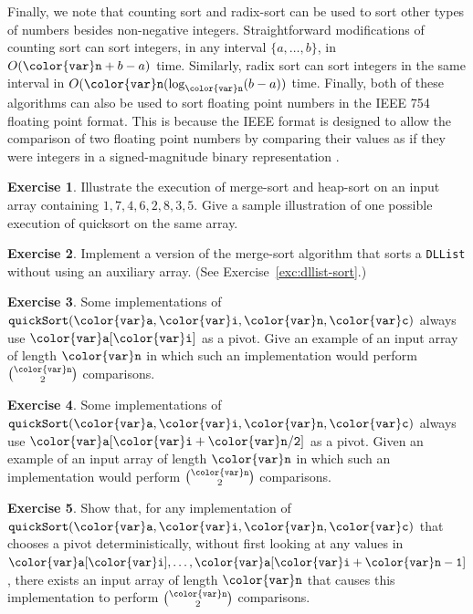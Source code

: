 \documentclass[10pt]{book}
\theoremstyle{plain}
\theoremstyle{definition}
\newtheorem{exc}{Exercise}[chapter]
\newcommand{\exclabel}[1]{\label{exc:#1}}
\newcommand{\excref}[1]{Exercise~\ref{exc:#1}}
\begin{document}
Finally, we note that counting sort and radix-sort can be used to sort
other types of numbers besides non-negative integers.  Straightforward
modifications of counting sort can sort integers, in any interval
$\{a,\ldots,b\}$, in $O(\ensuremath{\mathtt{{\color{var}n}}}+b-a)$ time.  Similarly, radix sort can sort
integers in the same interval in $O(\ensuremath{\mathtt{{\color{var}n}}}(\log_{\ensuremath{\mathtt{{\color{var}n}}}}(b-a))$ time.  Finally, both of these
algorithms can also be used to sort floating point numbers in the IEEE 754
floating point format.  This is because the IEEE format is designed to
allow the comparison of two floating point numbers by comparing their values
as if they were integers in a signed-magnitude binary representation
\cite{ieee754}.

\begin{exc}
  Illustrate the execution of merge-sort and heap-sort on an input array
  containing $1,7,4,6,2,8,3,5$.  Give a sample illustration of one possible
  execution of quicksort on the same array.
\end{exc}

\begin{exc}\exclabel{list-merge-sort}
  Implement a version of the merge-sort algorithm that sorts a \texttt{DLList}
  without using an auxiliary array. (See \excref{dllist-sort}.) 
\end{exc}

\begin{exc}
  Some implementations of \ensuremath{\mathtt{quickSort({\color{var}a},{\color{var}i},{\color{var}n},{\color{var}c})}} always use \ensuremath{\mathtt{{\color{var}a}[{\color{var}i}]}}
  as a pivot.  Give an example of an input array of length \ensuremath{\mathtt{{\color{var}n}}} in which
  such an implementation would perform $\binom{\ensuremath{\mathtt{{\color{var}n}}}}{2}$ comparisons.
\end{exc}

\begin{exc}
  Some implementations of \ensuremath{\mathtt{quickSort({\color{var}a},{\color{var}i},{\color{var}n},{\color{var}c})}} always use \ensuremath{\mathtt{{\color{var}a}[{\color{var}i}+{\color{var}n}/2]}}
  as a pivot.  Given an example of an input array of length \ensuremath{\mathtt{{\color{var}n}}} in which
  such an implementation would perform $\binom{\ensuremath{\mathtt{{\color{var}n}}}}{2}$ comparisons.
\end{exc}

\begin{exc}
  Show that, for any implementation of \ensuremath{\mathtt{quickSort({\color{var}a},{\color{var}i},{\color{var}n},{\color{var}c})}}
  that chooses a pivot deterministically, without first looking at
  any values in $\ensuremath{\mathtt{{\color{var}a}[{\color{var}i}]}},\ldots,\ensuremath{\mathtt{{\color{var}a}[{\color{var}i}+{\color{var}n}-1]}}$, there exists an input array of length \ensuremath{\mathtt{{\color{var}n}}}
  that causes this implementation to perform $\binom{\ensuremath{\mathtt{{\color{var}n}}}}{2}$ comparisons.
\end{exc}
\end{document}
